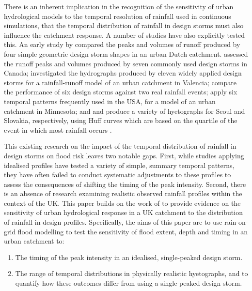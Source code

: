 \documentclass[APA,Times2COL]{WileyNJDv5}
\begin{document}
There is an inherent implication in the recognition of the sensitivity of urban hydrological models to the temporal resolution of rainfall used in continuous simulations, that the temporal distribution of rainfall in design storms must also influence the catchment response. A number of studies have also explicitly tested this. An early study by \citet{lambourne1987model} compared the peaks and volumes of runoff produced by four simple geometric design storm shapes in an urban Dutch catchment. \citet{nguyen2002rainfall} assessed the runoff peaks and volumes produced by seven commonly used design storms in Canada; \citet{balbastre2019comparison} investigated the hydrographs produced by eleven widely applied design storms for a rainfall-runoff model of an urban catchment in Valencia; \citet{krvavica2020evaluation} compare the performance of six design storms against two real rainfall events; \citet{hettiarachchi2018increase} apply six temporal patterns frequently used in the USA, for a model of an urban catchment in Minnesota; and \citet{li2021case} and \citet{bezak2018impact} produce a variety of hyetographs for Seoul and Slovakia, respectively, using Huff curves which are based on the quartile of the event in which most rainfall occurs \citep{yin2016intra}.

This existing research on the impact of the temporal distribution of rainfall in design storms on flood risk leaves two notable gaps. First, while studies applying idealised profiles have tested a variety of simple, summary temporal patterns, they have often failed to conduct systematic adjustments to these profiles to assess the consequences of shifting the timing of the peak intensity. Second, there is an absence of research examining realistic observed rainfall profiles within the context of the UK. This paper builds on the work of \citet{villalobos2023towards} to provide evidence on the sensitivity of urban hydrological response in a UK catchment to the distribution of rainfall in design profiles. Specifically, the aims of this paper are to use rain-on-grid flood modelling to test the sensitivity of flood extent, depth and timing in an urban catchment to: 

\begin{enumerate}
 \item The timing of the peak intensity in an idealised, single-peaked design storm. 
 \item The range of temporal distributions in physically realistic hyetographs, and to quantify how these outcomes differ from using a single-peaked design storm. 
\end{enumerate}
\end{document}
